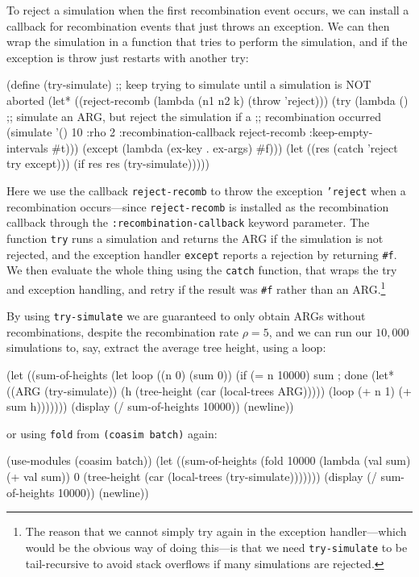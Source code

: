 \documentclass{manual}
\begin{document}
\begin{empfile}
To reject a simulation when the first recombination event occurs, we
can install a callback for recombination events that just throws an
exception.  We can then wrap the simulation in a function that tries
to perform the simulation, and if the exception is throw just restarts
with another try:
\begin{code}
(define (try-simulate)
  ;; keep trying to simulate until a simulation is NOT aborted
  (let* ((reject-recomb (lambda (n1 n2 k) (throw 'reject)))
         (try (lambda ()
                ;; simulate an ARG, but reject the simulation if a
                ;; recombination occurred
                (simulate '() 10 :rho 2
                          :recombination-callback reject-recomb
                          :keep-empty-intervals   #t)))
         (except (lambda (ex-key . ex-args) #f)))
    (let ((res (catch 'reject try except)))
      (if res res (try-simulate)))))
\end{code}
Here we use the callback \texttt{reject-recomb} to throw the exception
\texttt{'reject} when a recombination occurs---since
\texttt{reject-recomb} is installed as the recombination callback
through the \texttt{:recombination-callback} keyword parameter.  The
function \texttt{try} runs a simulation and returns the ARG if the
simulation is not rejected, and the exception handler \texttt{except}
reports a rejection by returning \texttt{\#f}.  We then evaluate the
whole thing using the \texttt{catch} function, that wraps the try and
exception handling, and retry if the result was \texttt{\#f} rather
than an ARG.\footnote{The reason that we cannot simply try again in
  the exception handler---which would be the obvious way of doing
  this---is that we need \texttt{try-simulate} to be tail-recursive to
  avoid stack overflows if many simulations are rejected.}

By using \texttt{try-simulate} we are guaranteed to only obtain ARGs
without recombinations, despite the recombination rate $\rho=5$, and
we can run our $10,000$ simulations to, say, extract the average tree
height, using a loop:
\begin{code}
(let ((sum-of-heights
       (let loop ((n 0) (sum 0))
         (if (= n 10000) sum ; done
             (let* ((ARG (try-simulate))
                    (h   (tree-height (car (local-trees ARG)))))
               (loop (+ n 1) (+ sum h)))))))
  (display (/ sum-of-heights 10000))
  (newline))
\end{code}
or using \texttt{fold} from \texttt{(coasim batch)} again:
\begin{code}
(use-modules (coasim batch))
(let ((sum-of-heights
       (fold 10000 (lambda (val sum) (+ val sum)) 0
             (tree-height (car (local-trees (try-simulate)))))))
  (display (/ sum-of-heights 10000))
  (newline))
\end{code}



\end{empfile}
\end{document}
